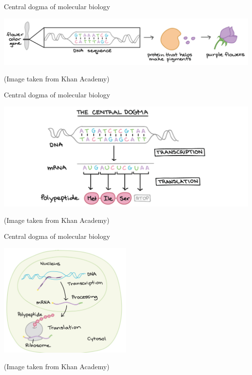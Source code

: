 \documentclass[
  10pt,
  ignorenonframetext,
  m]{beamer}
\begin{document}
\begin{frame}{Central dogma of molecular biology}
\protect\hypertarget{central-dogma-of-molecular-biology-1}{}

\centering

\includegraphics{images/geneToPheno.png}

\vfill
\tiny

(Image taken from Khan Academy)

\end{frame}

\begin{frame}{Central dogma of molecular biology}
\protect\hypertarget{central-dogma-of-molecular-biology-2}{}

\centering

\includegraphics{images/centralDogma.png}

\vfill
\tiny

(Image taken from Khan Academy)

\end{frame}

\begin{frame}{Central dogma of molecular biology}
\protect\hypertarget{central-dogma-of-molecular-biology-3}{}

\centering

\includegraphics[width=0.5\textwidth,height=\textheight]{images/humanCell.png}

\vfill
\tiny

(Image taken from Khan Academy)

\end{frame}
\end{document}
